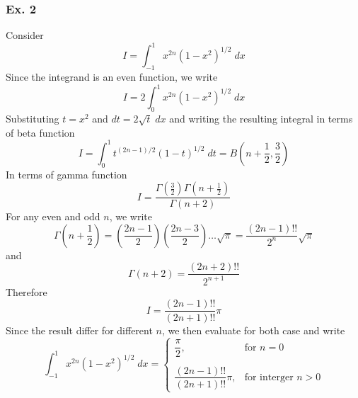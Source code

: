 \documentclass[../../main.tex]{subfiles}
\begin{document}
\subsubsection{Ex. 2} Consider 
\begin{equation*}
    I=\int_{-1}^{1}x^{2n}(1-x^2)^{1/2}\;dx
\end{equation*}
Since the integrand is an even function, we write 
\begin{equation*}
    I=2\int_{0}^{1}x^{2n}(1-x^2)^{1/2}\;dx
\end{equation*}
Substituting $t=x^2$ and $dt=2\sqrt{t}\;dx$ and writing the resulting integral in terms of beta function
\begin{equation*}
    I=\int_{0}^{1}t^{(2n-1)/2}(1-t)^{1/2}\;dt=B\left(n+\frac{1}{2}, \frac{3}{2}\right)
\end{equation*}
In terms of gamma function
\begin{equation*}
    I=\frac{\Gamma\left(\frac{3}{2}\right)\Gamma\left(n+\frac{1}{2}\right)}{\Gamma(n+2)}
\end{equation*}
For any even and odd $n$, we write 
\begin{equation*}
    \Gamma\left(n+\frac{1}{2}\right)=\left(\frac{2n-1}{2}\right)\left(\frac{2n-3}{2}\right) \dots \sqrt{\pi}=\frac{(2n-1)!!}{2^n}\sqrt{\pi}
\end{equation*}
and 
\begin{equation*}
    \Gamma(n+2)=\frac{(2n+2)!!}{2^{n+1}}
\end{equation*}
Therefore
\begin{equation*}
    I= \frac{(2n-1)!!}{(2n+1)!!}\pi
\end{equation*}
Since the result differ for different $n$, we then evaluate for both case and write 
\begin{equation*}
    \int_{-1}^{1}x^{2n}(1-x^2)^{1/2}\;dx=\begin{cases}
        \dfrac{\pi}{2},&\text{for $n=0$}\\\\
        \dfrac{(2n-1)!!}{(2n+1)!!}\pi,&\text{for interger $n>0$}
    \end{cases}
\end{equation*}
\end{document}

